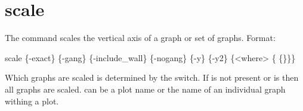 \section{scale}
\label{s:scale}

The  command scales the vertical axis of a graph or set of graphs.  Format:
\begin{example}
  scale \{-exact\} \{-gang\} \{-include_wall\} \{-nogang\} 
             \{-y\} \{-y2\} \{<where> \{<value1> \{<value2>\}\}\}
\end{example}

Which graphs are scaled is determined by the  switch. If  is not present or
 is  then all graphs are scaled.  can be a plot name or the name of
an individual graph withing a plot.

